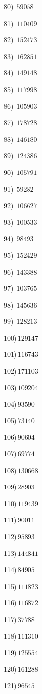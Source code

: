 \documentclass{article}
\begin{document}
\begin{multicols}{2}
80)$\,\,\,59058$ \par 
81)$\,\,\,110409$ \par 
82)$\,\,\,152473$ \par 
83)$\,\,\,162851$ \par 
84)$\,\,\,149148$ \par 
85)$\,\,\,117998$ \par 
86)$\,\,\,105903$ \par 
87)$\,\,\,178728$ \par 
88)$\,\,\,146180$ \par 
89)$\,\,\,124386$ \par 
90)$\,\,\,105791$ \par 
91)$\,\,\,59282$ \par 
92)$\,\,\,106627$ \par 
93)$\,\,\,100533$ \par 
94)$\,\,\,98493$ \par 
95)$\,\,\,152429$ \par 
96)$\,\,\,143388$ \par 
97)$\,\,\,103765$ \par 
98)$\,\,\,145636$ \par 
99)$\,\,\,128213$ \par 
100)$\,129147$ \par 
101)$\,116743$ \par 
102)$\,171103$ \par 
103)$\,109204$ \par 
104)$\,93590$ \par 
105)$\,73140$ \par 
106)$\,90604$ \par 
107)$\,69774$ \par 
108)$\,130668$ \par 
109)$\,28903$ \par 
110)$\,119439$ \par 
111)$\,90011$ \par 
112)$\,95893$ \par 
113)$\,144841$ \par 
114)$\,84905$ \par 
115)$\,111823$ \par 
116)$\,116872$ \par 
117)$\,37788$ \par 
118)$\,111310$ \par 
119)$\,125554$ \par 
120)$\,161288$ \par 
121)$\,96545$ \par 

\end{multicols}
\end{document}
